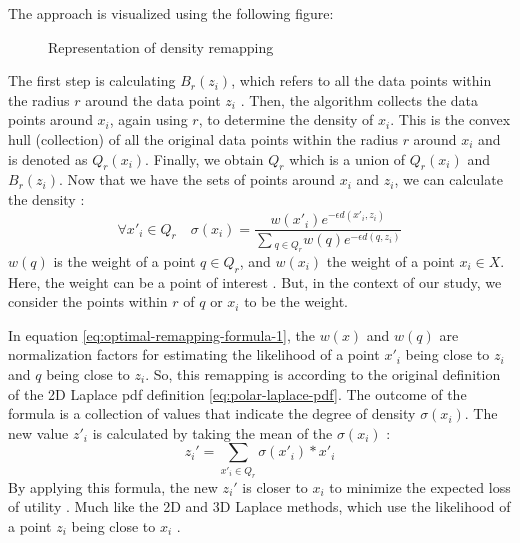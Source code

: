 The approach is visualized using the following figure:
\begin{figure}[H]
  
  \label{fig:optimal-remapping}
  \caption{Representation of density remapping \citep{chatzikokolakis_efficient_2017}}
\end{figure}
The first step is calculating $B_r(z_i)$, which refers to all the data points within the radius $r$ around the data point $z_i$ \citep{chatzikokolakis_efficient_2017}.
Then, the algorithm collects the data points around $x_i$, again using $r$, to determine the density of $x_i$.
This is the convex hull (collection) of all the original data points within the radius $r$ around $x_i$ and is denoted as $Q_r (x_i)$.
Finally, we obtain $Q_r$ which is a union of $Q_r (x_i)$ and $B_r(z_i)$.
Now that we have the sets of points around $x_i$ and $z_i$, we can calculate the density \citep{chatzikokolakis_efficient_2017}:
\begin{equation}
  \forall x'_i \in Q_r \quad \sigma(x_i) = \frac{w(x'_i)e^{-\epsilon d(x'_i, z_i)}}{\sum{_{q\in Q_r} w(q)e^{-\epsilon d(q, z_i)}}}
  \label{eq:optimal-remapping-formula-1}
\end{equation}
$w(q)$ is the weight of a point $q \in Q_r$, and $w(x_i)$ the weight of a point $x_i \in X$.
Here, the weight can be a point of interest \citep{chatzikokolakis_efficient_2017}.
But, in the context of our study, we consider the points within $r$ of $q$ or $x_i$ to be the weight.

In equation \ref{eq:optimal-remapping-formula-1}, the $w(x)$ and $w(q)$ are normalization factors for estimating the likelihood of a point $x'_i$ being close to $z_i$ and $q$ being close to $z_i$.
So, this remapping is according to the original definition of the 2D Laplace \gls{pdf} definition \ref{eq:polar-laplace-pdf}.
The outcome of the formula is a collection of values that indicate the degree of density $\sigma(x_i)$.
The new value $z'_i$ is calculated by taking the mean of the $\sigma(x_i)$ \citep{chatzikokolakis_efficient_2017}:
\begin{equation}
  z_i' = \sum_{x'_i \in Q_r} \sigma(x'_i) * x'_i
  \label{eq:optimal-remapping-formula-2}
\end{equation}
By applying this formula, the new $z_i'$ is closer to $x_i$ to minimize the expected loss of utility \citep{chatzikokolakis_efficient_2017}.
Much like the 2D and 3D Laplace methods, which use the likelihood of a point $z_i$ being close to $x_i$ \citep{DBLP:journals/corr/abs-1212-1984, 9646489}.

